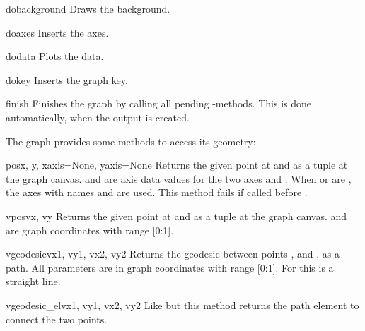 \begin{methoddesc}{dobackground}{}
  Draws the background.
\end{methoddesc}

\begin{methoddesc}{doaxes}{}
  Inserts the axes.
\end{methoddesc}

\begin{methoddesc}{dodata}{}
  Plots the data.
\end{methoddesc}

\begin{methoddesc}{dokey}{}
  Inserts the graph key.
\end{methoddesc}

\begin{methoddesc}{finish}{}
  Finishes the graph by calling all pending -methods. This
  is done automatically, when the output is created.
\end{methoddesc}

The graph provides some methods to access its geometry:

\begin{methoddesc}{pos}{x, y, xaxis=None, yaxis=None}
  Returns the given point at  and  as a tuple
   at the graph canvas.  and  are
  axis data values for the two axes  and . When
   or  are , the axes with names
   and  are used. This method fails if called before
  .
\end{methoddesc}

\begin{methoddesc}{vpos}{vx, vy}
  Returns the given point at  and  as a tuple
   at the graph canvas.  and  are
  graph coordinates with range [0:1].
\end{methoddesc}

\begin{methoddesc}{vgeodesic}{vx1, vy1, vx2, vy2}
  Returns the geodesic between points ,  and
  ,  as a path. All parameters are in graph
  coordinates with range [0:1]. For  this is a straight
  line.
\end{methoddesc}

\begin{methoddesc}{vgeodesic\_el}{vx1, vy1, vx2, vy2}
  Like  but this method returns the path element to
  connect the two points.
\end{methoddesc}

